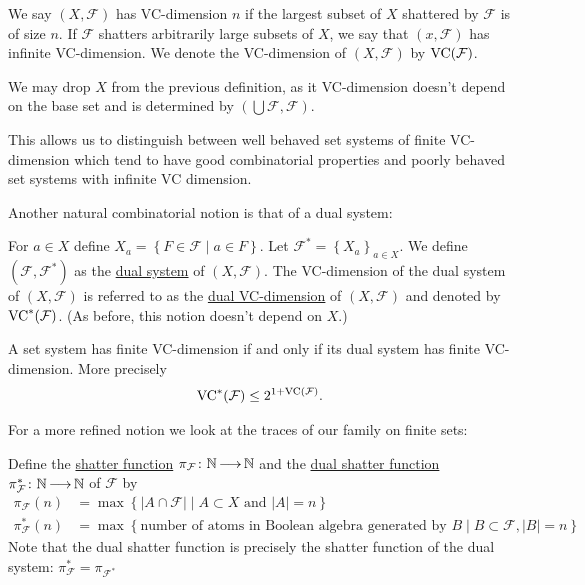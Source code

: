 \documentclass{amsart}
\newcommand{\F}{\mathcal F}
\newcommand{\curly}[1]{\left\{#1\right\}}
\newcommand{\defn}{\underline}
\begin{document}
\begin{Definition}
  We say $(X, \F)$ has VC-dimension $n$ if the largest subset of $X$ shattered by $\F$ is of size $n$.
  If $\F$ shatters arbitrarily large subsets of $X$, we say that $(x, \F)$ has infinite VC-dimension.
  We denote the VC-dimension of $(X, \F)$ by $\VC(\F)$.
\end{Definition}  

\begin{Note}
  We may drop $X$ from the previous definition, as it VC-dimension doesn't depend on the base set and is determined by $(\bigcup \F, \F)$.
\end{Note}
This allows us to distinguish between well behaved set systems of finite VC-dimension which tend to have good combinatorial properties and
poorly behaved set systems with infinite VC dimension.

Another natural combinatorial notion is that of a dual system:
\begin{Definition}
  For $a \in X$ define $X_a = \curly{F \in \F \mid a \in F}$.
  Let $\F^* = \curly{X_a}_{a \in X}$.
  We define $(\F, \F^*)$ as the \defn{dual system} of $(X, \F)$.
  The VC-dimension of the dual system of $(X, \F)$ is referred to as the \defn{dual VC-dimension} of $(X, \F)$ and denoted by $\VC^*(\F)$.
  (As before, this notion doesn't depend on $X$.)
\end{Definition}  

\begin{Lemma}
  A set system has finite VC-dimension if and only if its dual system has finite VC-dimension.
  More precisely
  \begin{align*}
    \VC^*(\F) \leq 2^{1+\VC(\F)}.
  \end{align*}
\end{Lemma}

For a more refined notion we look at the traces of our family on finite sets:
\begin{Definition}
  Define the \defn{shatter function} $\pi_\F \colon \N \arr \N$ and the \defn{dual shatter function} $\pi^*_\F \colon \N \arr \N$ of $\F$ by 
  \begin{align*}
    \pi_\F(n) &= \max \curly{|A \cap \F| \mid A \subset X \text{ and } |A| = n} \\
    \pi^*_\F(n) &= \max \curly{\text{number of atoms in Boolean algebra generated by $B$} \mid B \subset \F, |B| = n}
  \end{align*}
  Note that the dual shatter function is precisely the shatter function of the dual system: $\pi^*_\F = \pi_{\F^*}$
\end{Definition}  
\end{document}
